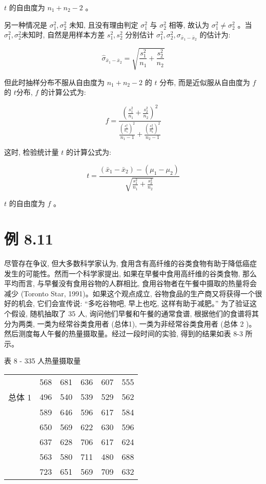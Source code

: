 \documentclass[10pt]{article}
\begin{document}
\begin{CJK*}{UTF8}{bsmi}
$t$ 的自由度为 $n_{1}+n_{2}-2$ 。

另一种情况是 $\sigma_{1}^{2}, \sigma_{2}^{2}$ 未知, 且没有理由判定 $\sigma_{1}^{2}$ 与 $\sigma_{2}^{2}$ 相等, 故认为 $\sigma_{1}^{2} \neq \sigma_{2}^{2}$ 。当 $\sigma_{1}^{2}, \sigma_{2}^{2}$未知时, 自然是用样本方差 $s_{1}^{2}, s_{2}^{2}$ 分别估计 $\sigma_{1}^{2}, \sigma_{2}^{2}, \sigma_{\bar{x}_{1}-\bar{x}_{2}}$ 的估计为:


\begin{equation*}
\hat{\sigma}_{\bar{x}_{1}-\bar{x}_{2}}=\sqrt{\frac{s_{1}^{2}}{n_{1}}+\frac{s_{2}^{2}}{n_{2}}} \tag{8.9}
\end{equation*}


但此时抽样分布不服从自由度为 $n_{1}+n_{2}-2$ 的 $t$ 分布, 而是近似服从自由度为 $f$ 的 $t$分布, $f$ 的计算公式为:


\begin{equation*}
f=\frac{\left(\frac{s_{1}^{2}}{n_{1}}+\frac{s_{2}^{2}}{n_{2}}\right)^{2}}{\frac{\left(\frac{s_{1}^{2}}{n_{1}}\right)^{2}}{n_{1}-1}+\frac{\left(\frac{s_{2}^{2}}{n_{2}}\right)^{2}}{n_{2}-1}} \tag{8.10}
\end{equation*}


这时, 检验统计量 $t$ 的计算公式为:


\begin{equation*}
t=\frac{\left(\bar{x}_{1}-\bar{x}_{2}\right)-\left(\mu_{1}-\mu_{2}\right)}{\sqrt{\frac{s_{1}^{2}}{n_{1}}+\frac{s_{2}^{2}}{n_{2}}}} \tag{8.11}
\end{equation*}


$t$ 的自由度为 $f$ 。

\section*{例 8.11}
尽管存在争议, 但大多数科学家认为, 食用含有高纤维的谷类食物有助于降低癌症发生的可能性。然而一个科学家提出, 如果在早餐中食用高纤维的谷类食物, 那么平均而言, 与早餐没有食用谷物的人群相比, 食用谷物者在午餐中摄取的热量将会减少 (Toronto Star, 1991)。如果这个观点成立, 谷物食品的生产商又将获得一个很好的机会, 它们会宣传说: “多吃谷物吧, 早上也吃, 这样有助于减肥。” 为了验证这个假设, 随机抽取了 35 人, 询问他们早餐和午餐的通常食谱, 根据他们的食谱将其分为两类, 一类为经常谷类食用者 (总体1), 一类为非经常谷类食用者 (总体 2 )。然后测度每人午餐的热量摄取量。经过一段时间的实验, 得到的结果如表 8-3 所示。

表 8 - 335 人热量摄取量

\begin{center}
\begin{tabular}{llllll}
\hline
 & 568 & 681 & 636 & 607 & 555 \\
总体 1 & 496 & 540 & 539 & 529 & 562 \\
 & 589 & 646 & 596 & 617 & 584 \\
\hline
 & 650 & 569 & 622 & 630 & 596 \\
 & 637 & 628 & 706 & 617 & 624 \\
 & 563 & 580 & 711 & 480 & 688 \\
 & 723 & 651 & 569 & 709 & 632 \\
\hline
\end{tabular}
\end{center}


\end{CJK*}
\end{document}
